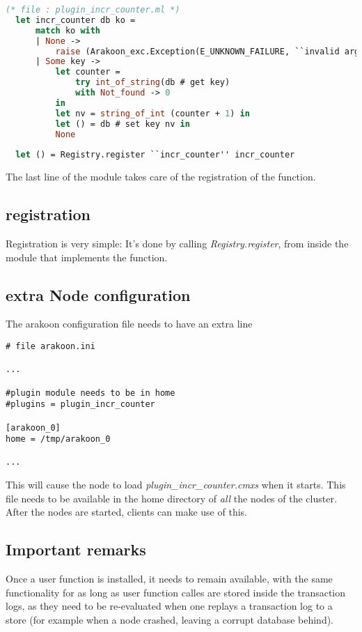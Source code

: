 \begin{lstlisting}[language=Caml]
  (* file : plugin_incr_counter.ml *)
  let incr_counter db ko = 
      match ko with
      | None -> 
          raise (Arakoon_exc.Exception(E_UNKNOWN_FAILURE, ``invalid arg''))
      | Some key -> 
          let counter = 
              try int_of_string(db # get key) 
              with Not_found -> 0 
          in
          let nv = string_of_int (counter + 1) in
          let () = db # set key nv in
          None
 
  let () = Registry.register ``incr_counter'' incr_counter
\end{lstlisting}
The last line of the module takes care of the registration of the function.
\subsection{registration}
Registration is very simple: It's done by calling \emph{Registry.register}, from inside the module that implements the function.

\subsection{extra Node configuration}
The arakoon configuration file needs to have an extra line 
\begin{verbatim}
# file arakoon.ini

...

#plugin module needs to be in home
#plugins = plugin_incr_counter

[arakoon_0]
home = /tmp/arakoon_0

...

\end{verbatim}
This will cause the node to load \emph{plugin\_incr\_counter.cmxs} when it starts. 
This file needs to be available in the home directory of \emph{all} the nodes of the cluster. After the nodes are started, clients can make use of this.

\subsection{Important remarks}
Once a user function is installed, it needs to remain available, with the same functionality for as long as user function calles are stored inside the transaction logs, as they need to be re-evaluated when one replays a transaction log to a store (for example when a node crashed, leaving a corrupt database behind).
